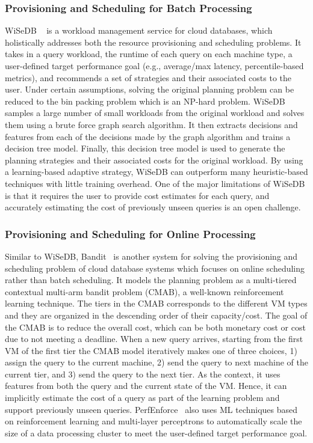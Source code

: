 \subsubsection{Provisioning and Scheduling for Batch Processing}
WiSeDB ~\cite{wisedb} is a workload management service for cloud databases, which holistically addresses both the resource provisioning and scheduling problems.
It takes in a query workload, the runtime of each query on each machine type, a user-defined target performance goal (e.g., average/max latency, percentile-based metrics), and recommends a set of strategies and their associated costs to the user.
Under certain assumptions, solving the original planning problem can be reduced to the bin packing problem which is an NP-hard problem.
WiSeDB samples a large number of small workloads from the original workload and solves them using a brute force graph search algorithm.
It then extracts decisions and features from each of the decisions made by the graph algorithm and trains a decision tree model.
Finally, this decision tree model is used to generate the planning strategies and their associated costs for the original workload.
By using a learning-based adaptive strategy, WiSeDB can outperform many heuristic-based techniques with little training overhead.
One of the major limitations of WiSeDB is that it requires the user to provide cost estimates for each query, and accurately estimating the cost of previously unseen queries is an open challenge.


\subsubsection{Provisioning and Scheduling for Online Processing}
Similar to WiSeDB, Bandit~\cite{bandit} is another system for solving the provisioning and scheduling problem of cloud database systems which focuses on online scheduling rather than batch scheduling.
It models the planning problem as a multi-tiered contextual multi-arm bandit problem (CMAB), a well-known reinforcement learning technique.
The tiers in the CMAB corresponds to the different VM types and they are organized in the descending order of their capacity/cost. 
The goal of the CMAB is to reduce the overall cost, which can be both monetary cost or cost due to not meeting a deadline.
When a new query arrives, starting from the first VM of the first tier the CMAB model iteratively makes one of three choices, 1) assign the query to the current machine, 2) send the query to next machine of the current tier, and 3) send the query to the next tier.
As the context, it uses features from both the query and the current state of the VM. Hence, it can implicitly estimate the cost of a query as part of the learning problem and support previously unseen queries.
PerfEnforce~\cite{perfenforce} also uses ML techniques based on reinforcement learning and multi-layer perceptrons to automatically scale the size of a data processing cluster to meet the user-defined target performance goal.

